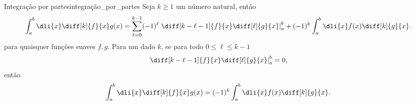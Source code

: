 \begin{lemma}{Integração por partes}{integração_por_partes}
    Seja \(k \geq 1\) um número natural, então
    \begin{equation*}
        \int_{a}^{b} \dli{x} \diff[k]{f}{x}g(x) = \sum_{\ell = 0}^{k-1} (-1)^{\ell} \left.\diff[k-\ell-1]{f}{x}\diff[\ell]{g}{x}\right\rvert_a^b + (-1)^k \int_{a}^{b}\dli{x} f(x)\diff[k]{g}{x}.
    \end{equation*}
    para quaisquer funções suaves \(f, g\). Para um dado \(k\), se para todo \(0 \leq \ell \leq k - 1\)
    \begin{equation*}
        \left.\diff[k-\ell-1]{f}{x}\diff[\ell]{g}{x}\right\rvert_a^b = 0,
    \end{equation*}
    então
    \begin{equation*}
        \int_{a}^{b} \dli{x} \diff[k]{f}{x}g(x) = (-1)^k \int_{a}^{b}\dli{x} f(x)\diff[k]{g}{x}.
    \end{equation*}
\end{lemma}
